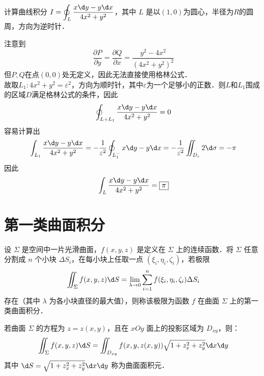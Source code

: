\documentclass[12pt, a4paper, oneside, UTF8]{ctexbook}
\begin{document}
\begin{example}
    计算曲线积分 $I=\displaystyle\oint_L \dfrac{x\d y-y\d x}{4x^2+y^2}$，其中 $L$ 是以$(1,0)$为圆心，半径为$R$的圆周，方向为逆时针．
\end{example}
\begin{solution}
    注意到\[\frac{\partial P}{\partial y} = \frac{\partial Q}{\partial x} = \frac{y^2-4x^2}{(4x^2+y^2)^2}\]
    但$P,Q$在点$(0,0)$处无定义，因此无法直接使用格林公式．\\
    故取$L_1:4x^2+y^2=\varepsilon^2$，方向为顺时针，其中$\varepsilon$为一个足够小的正数．则$L$和$L_1$围成的区域$D$满足格林公式的条件，因此
    \[\oint_{L+L_1} \dfrac{x\d y-y\d x}{4x^2+y^2} = 0\]
    容易计算出
    \[
    \int_{L_1} \dfrac{x\d y-y\d x}{4x^2+y^2} = -\frac{1}{\varepsilon^2}\oint_{L_1^-} x\d y-y\d x
    = -\frac{1}{\varepsilon^2}\iint_{D_\varepsilon} 2\d \sigma = -\pi
    \]
    因此\[\int_L \dfrac{x\d y-y\d x}{4x^2+y^2} = \boxed{\pi}\]
\end{solution}
\section{第一类曲面积分}
\begin{definition}[第一类曲面积分的定义]
    设 $\Sigma$ 是空间中一片光滑曲面，$f(x,y,z)$ 是定义在 $\Sigma$ 上的连续函数．将 $\Sigma$ 任意分割成 $n$ 个小块 $\Delta S_i$，在每小块上任取一点 $(\xi_i, \eta_i, \zeta_i)$，若极限
    \[ \iint_\Sigma f(x,y,z) \d S = \lim_{\lambda \to 0} \sum_{i=1}^n f(\xi_i, \eta_i, \zeta_i) \Delta S_i \]
    存在（其中 $\lambda$ 为各小块直径的最大值），则称该极限为函数 $f$ 在曲面 $\Sigma$ 上的第一类曲面积分．
\end{definition}

\begin{theorem}[计算公式]
    若曲面 $\Sigma$ 的方程为 $z = z(x,y)$，且在 $xOy$ 面上的投影区域为 $D_{xy}$，则：
    \[ \iint_\Sigma f(x,y,z) \d S = \iint_{D_{xy}} f(x,y,z(x,y)) \sqrt{1 + z_x^2 + z_y^2} \d x \d y \]
    其中 $\d S = \sqrt{1 + z_x^2 + z_y^2} \d x \d y$ 称为曲面面积元．
\end{theorem}
\end{document}
